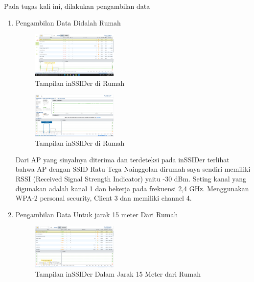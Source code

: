 \documentclass[conference]{IEEEtran}
\begin{document}
    Pada tugas kali ini, dilakukan pengambilan data
    \begin{enumerate}
    \vspace{0.2cm}
    
        \item Pengambilan Data Didalah Rumah
        
    \begin{figure}[h]
        \centering
        \includegraphics[width=0.4\textwidth]{8.png}
        \caption{Tampilan inSSIDer di Rumah}
    \end{figure}
    
    \begin{figure}[h]
        \centering
        \includegraphics[width=0.4\textwidth]{9.png}
        \caption{Tampilan inSSIDer di Rumah}
    \end{figure}
    \vspace{0.3cm}
    
    Dari AP yang sinyalnya diterima dan terdeteksi pada inSSIDer terlihat bahwa AP dengan SSID Ratu Tega Nainggolan dirumah saya sendiri memiliki RSSI (Received Signal Strength Indicator) yaitu -30 dBm. Seting kanal yang digunakan adalah kanal 1 dan bekerja pada frekuensi 2,4 GHz. Menggunakan WPA-2 personal security, Client 3 dan memiliki channel 4.
    
    \vspace{0.3cm}
    
        \item Pengambilan Data Untuk jarak 15 meter Dari Rumah
        
    \begin{figure}[h]
        \centering
        \includegraphics[width=0.4\textwidth]{10.png}
        \caption{Tampilan inSSIDer Dalam Jarak 15 Meter dari Rumah}
    \end{figure}
    

\end{enumerate}
\end{document}

